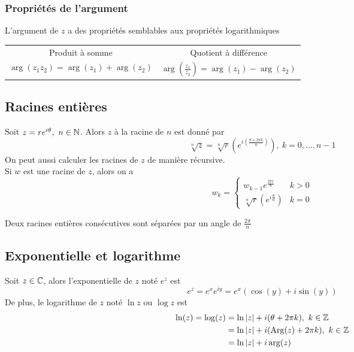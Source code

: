 \subsubsection{Propriétés de l'argument}
L'argument de $z$ a des propriétés semblables aux propriétés logarithmiques
\begin{center}
    \begin{tabular}{c@{\hskip 1in}c}
         Produit à somme & Quotient à différence \\
         $\arg(z_1z_2) = \arg(z_1) + \arg(z_2)$ & $\arg\left( \frac{z_1}{z_2}\right) = \arg(z_1) - \arg(z_2)$
    \end{tabular}
\end{center}

\endgroup

\subsection{Racines entières}
\label{whole_roots}
Soit $z = re^{i\theta},\ n \in \mathbb{N}$. Alors $z$ à la racine de $n$ est donné par
\[
    \sqrt[n]{z} = \sqrt[n]{r} \left( e^{i \left( \frac{\theta + 2\pi k}{n} \right) } \right), \ k = 0, \dots, n - 1
\]
On peut aussi calculer les racines de $z$ de manière récursive. \\
Si $w$ est une racine de $z$, alors on a
\[
    w_k = \begin{cases}
        w_{k - 1}e^{ \frac{2\pi i}{n} }                    & k > 0 \\[0.5em]
        \sqrt[n]{r} \left( e^{i \frac{\theta}{n} } \right) & k = 0
    \end{cases}
\]
\begin{remark}
    Deux racines entières consécutives sont séparées par un angle de $\frac{2\pi}{n}$
\end{remark}

\subsection{Exponentielle  et logarithme}
Soit $z \in \mathbb{C}$, alors l'exponentielle de $z$ noté $e^z$ est 
\[
    e^z = e^x e^{iy} = e^x (\cos(y) + i\sin(y))
\]
De plus, le logarithme de $z$ noté $\ln{z}$ ou $\log{z}$ est
\begin{align*}
    \ln(z) = \log(z) & = \ln|z| + i(\theta + 2\pi k), \ k \in \mathbb{Z}        \\
                     & = \ln|z| + i(\text{Arg}(z) + 2\pi k), \ k \in \mathbb{Z} \\
                     & = \ln|z| + i\arg(z)                              \\
\end{align*}

